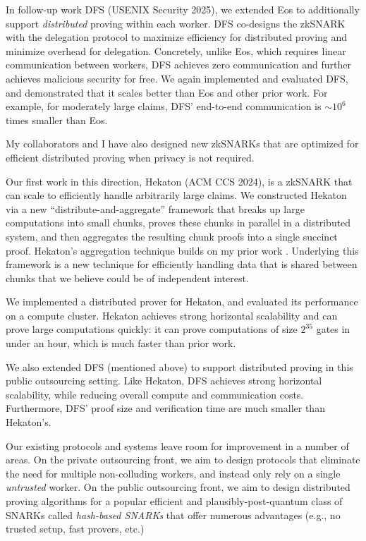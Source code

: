 \documentclass[11pt,letterpaper]{article}
\theoremstyle{definition} %
\theoremstyle{remark} %
\begin{document}
In follow-up work DFS \cite{HuMWXYZ25} (USENIX Security 2025), we extended Eos to additionally support \emph{distributed} proving within each worker. 
DFS co-designs the zkSNARK with the delegation protocol to maximize efficiency for distributed proving and minimize overhead for delegation.
Concretely, unlike Eos, which requires linear communication between workers, DFS achieves zero communication and further achieves malicious security for free. 
We again implemented and evaluated DFS, and demonstrated that it scales better than Eos and other prior work. For example, for moderately large claims, DFS' end-to-end communication is $\sim 10^6$ times smaller than Eos. 


My collaborators and I have also designed new zkSNARKs that are optimized for efficient distributed proving when privacy is not required.

Our first work in this direction, Hekaton \cite{RosenbergMHMM24} (ACM CCS 2024), is a zkSNARK that can scale to efficiently handle arbitrarily large claims. 
We constructed Hekaton via a new ``distribute-and-aggregate'' framework that breaks up large computations into small chunks, proves these chunks in parallel in a distributed system, and then aggregates the resulting chunk proofs into a single succinct proof. 
Hekaton's aggregation technique builds on my prior work \cite{BunzMMTV21}.
Underlying this framework is a new technique for efficiently handling data that is shared between chunks that we believe could be of independent interest.
  
We implemented a distributed prover for Hekaton, and evaluated its performance on a compute cluster. Hekaton achieves strong horizontal scalability and can prove large computations quickly: it can prove computations of size $2^{35}$  gates in under an hour, which is much faster than prior work.

We also extended DFS (mentioned above) to support distributed proving in this public outsourcing setting. Like Hekaton, DFS achieves strong horizontal scalability, while reducing overall compute and communication costs.
Furthermore, DFS' proof size and verification time are much smaller than Hekaton's.

Our existing protocols and systems leave room for improvement in a number of areas.
On the private outsourcing front, we aim to design protocols that eliminate the need for multiple non-colluding workers, and instead only rely on a single \emph{untrusted} worker.
On the public outsourcing front, we aim to design distributed proving algorithms for a popular efficient and plausibly-post-quantum class of SNARKs called \emph{hash-based SNARKs} \cite{BenSassonCS16} that offer numerous advantages (e.g., no trusted setup, fast provers, etc.)
\end{document}
